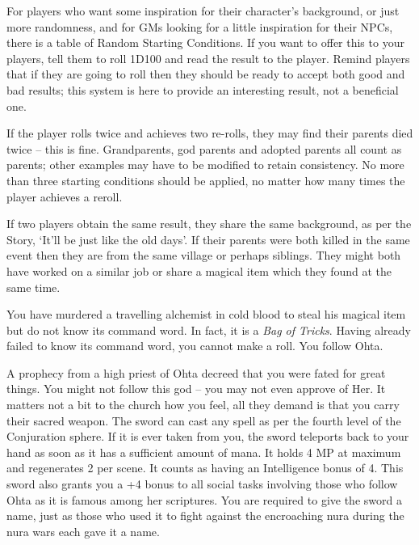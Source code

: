 \begin{multicols}{2}

\noindent
For players who want some inspiration for their character's background, or just more randomness, and for GMs looking for a little inspiration for their NPCs, there is a table of Random Starting Conditions.  If you want to offer this to your players, tell them to roll 1D100 and read the result to the player.  Remind players that if they are going to roll then they should be ready to accept both good and bad results; this system is here to provide an interesting result, not a beneficial one.

If the player rolls twice and achieves two re-rolls, they may find their parents died twice -- this is fine.
Grandparents, god parents and adopted parents all count as parents; other examples may have to be modified to retain consistency.
No more than three starting conditions should be applied, no matter how many times the player achieves a reroll.

	If two players obtain the same result, they share the same background, as per the Story, `It'll be just like the old days'.  If their parents were both killed in the same event then they are from the same village or perhaps siblings.  They might both have worked on a similar job or share a magical item which they found at the same time.

\setcounter{list}{0}
\begin{list}{\addtocounter{list}{1}\textbf{:}}{\raggedleft}

	\item
	You have murdered a travelling alchemist in cold blood to steal his magical item but do not know its command word.
	In fact, it is a \textit{Bag of Tricks}.
	Having already failed to know its command word, you cannot make a roll.
	You follow Ohta.

	\item
	A prophecy from a high priest of Ohta decreed that you were fated for great things.
	You might not follow this god -- you may not even approve of Her.
	It matters not a bit to the church how you feel, all they demand is that you carry their sacred weapon.
	The sword can cast any spell as per the fourth level of the Conjuration sphere.
	If it is ever taken from you, the sword teleports back to your hand as soon as it has a sufficient amount of mana.
	It holds 4 MP at maximum and regenerates 2 per scene.
	It counts as having an Intelligence bonus of 4.
	This sword also grants you a +4 bonus to all social tasks involving those who follow Ohta as it is famous among her scriptures.
	You are required to give the sword a name, just as those who used it to fight against the encroaching nura during the nura wars each gave it a name.


\end{list}
\end{multicols}
